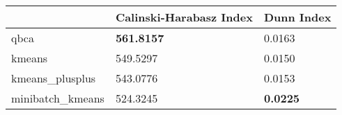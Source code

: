 \begin{table}[htbp]
\centering
\begin{tabular}{lll}
\toprule
 & Calinski-Harabasz Index & Dunn Index \\
\midrule
qbca & \textbf{561.8157} & 0.0163 \\
kmeans & 549.5297 & 0.0150 \\
kmeans_plusplus & 543.0776 & 0.0153 \\
minibatch_kmeans & 524.3245 & \textbf{0.0225} \\
\bottomrule
\end{tabular}
\end{table}
